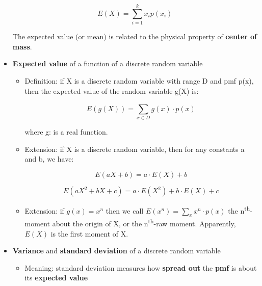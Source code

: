 \documentclass[12pt]{report}
\renewcommand{\_}{\kern-1.5pt\textunderscore\kern-1.5pt}
\begin{document}
\begin{itemize}
 \[ E \left( X \right) = \sum _{i=1}^{k}x_{i}p \left( x_{i} \right)  \] \par

The expected value (or mean) is related to the physical property of \textbf{center of mass}. \par

	\item \textbf{Expected value} of a function of a discrete random variable\par

\begin{itemize}
	\item Definition: if X is a discrete random variable with range D and pmf p(x), then the expected value of the random variable g(X) is:\par

 \[ E \left( g \left( X \right)  \right) = \sum _{x \in D}^{}g \left( x \right)  \cdot p \left( x \right)  \] \par

\tab \tab where g:    is a real function.\par

	\item Extension: if X is a discrete random variable, then for any constants a and b, we have:\par

 \[ E \left( aX+b \right) =a \cdot E \left( X \right) +b \] \par

 \[ E \left( aX^{2}+bX+c \right) =a \cdot  E \left( X^{2} \right) +b \cdot E \left( X \right) +c \] \par

	\item Extension: if  \( g \left( x \right) =x^{n} \)  then we call  \( E \left( x^{n} \right) = \sum _{x}^{}x^{n} \cdot p \left( x \right)  \)  the n\textsuperscript{th}-moment about the origin of X, or the n\textsuperscript{th}-raw moment. Apparently,  \( E \left( X \right)  \)  is the first moment of X. \par


\end{itemize}
	\item \textbf{Variance} and \textbf{standard deviation} of a discrete random variable\par

\begin{itemize}
	\item Meaning: standard deviation measures how\textbf{ spread out} the \textbf{pmf} is about its\textbf{ expected value}\par


\end{itemize}
\end{itemize}
\end{document}
